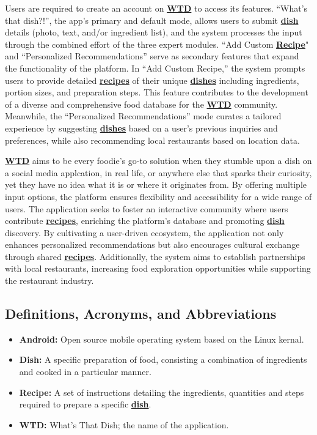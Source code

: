 \documentclass[]{article}
\begin{document}
Users are required to create an account on \hyperref[WTD]{\textbf{WTD}} to access its features. “What’s that dish?!”, the app’s primary and default mode, allows users to submit \hyperref[Dish]{\textbf{dish}} details (photo, text, and/or ingredient list), and the system processes the input through the combined effort of the three expert modules. “Add Custom \hyperref[Recipe]{\textbf{Recipe}}" and “Personalized Recommendations” serve as secondary features that expand the functionality of the platform. In “Add Custom Recipe,” the system prompts users to provide detailed \hyperref[Recipe]{\textbf{recipes}} of their unique \hyperref[Dish]{\textbf{dishes}} including ingredients, portion sizes, and preparation steps. This feature contributes to the development of a diverse and comprehensive food database for the \hyperref[WTD]{\textbf{WTD}} community. Meanwhile, the “Personalized Recommendations” mode curates a tailored experience by suggesting \hyperref[Dish]{\textbf{dishes}} based on a user’s previous inquiries and preferences, while also recommending local restaurants based on location data.

\hyperref[WTD]{\textbf{WTD}} aims to be every foodie’s go-to solution when they stumble upon a dish on a social media applcation, in real life, or anywhere else that sparks their curiosity, yet they have no idea what it is or where it originates from. By offering multiple input options, the platform ensures flexibility and accessibility for a wide range of users. The application seeks to foster an interactive community where users contribute \hyperref[Recipe]{\textbf{recipes}}, enriching the platform’s database and promoting \hyperref[Dish]{\textbf{dish}} discovery. By cultivating a user-driven ecosystem, the application not only enhances personalized recommendations but also encourages cultural exchange through shared \hyperref[Recipe]{\textbf{recipes}}. Additionally, the system aims to establish partnerships with local restaurants, increasing food exploration opportunities while supporting the restaurant industry.


\subsection{Definitions, Acronyms, and Abbreviations}
\label{sub:definitions_acronyms_and_abbreviations}

\begin{itemize}
	\item \label{Android}{\textbf{Android:}} Open source mobile operating system based on the Linux kernal.
	\item \label{Dish}{\textbf{Dish:}} A specific preparation of food, consisting a combination of ingredients and cooked in a particular manner.
	\item \label{Recipe}{\textbf{Recipe:}} A set of instructions detailing the ingredients, quantities and steps required to prepare a specific \hyperref[Dish]{\textbf{dish}}.
	\item \label{WTD}{\textbf{WTD:}} What’s That Dish; the name of the application.
\end{itemize}
\end{document}
